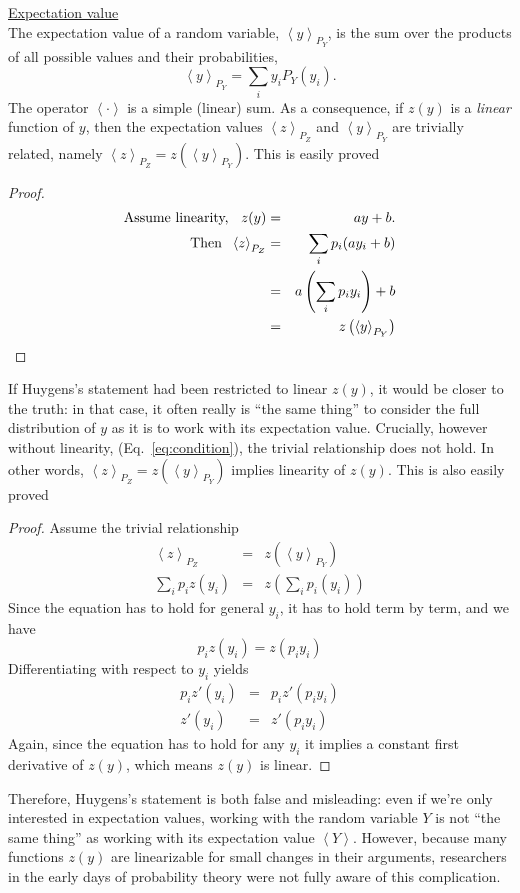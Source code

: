 \documentclass[pdftex]{article}
\newcommand{\ave}[1]{\left\langle#1 \right\rangle}
\newcommand{\elabel}[1]{\label{eq:#1}}
\newcommand{\eref}[1]{(Eq.~\ref{eq:#1})}
\newcommand{\be}{\begin{equation}}
\newcommand{\ee}{\end{equation}}
\newcommand{\bea}{\begin{eqnarray}}
\newcommand{\eea}{\end{eqnarray}}
\begin{document}
\underline{Expectation value}\\
The expectation value of a random variable, $\ave{y}_{P_Y}$, is the sum over the products of all possible values and their probabilities, 
\be
\ave{y}_{P_Y}=\sum_i y_i P_Y(y_i).
\ee
The operator $\ave{\cdot}$ is a simple (linear) sum. As a consequence, if $z(y)$ is a {\it linear} function of $y$, then the expectation values $\ave{z}_{P_Z}$ and
$\ave{y}_{P_Y}$ are trivially related, namely $\ave{z}_{P_Z}=z\left(\ave{y}_{P_Y}\right)$. 
This is easily proved
\begin{proof}
\bea
\text{Assume linearity, \hspace{.2cm}} z(y)&=&a y +b. \elabel{condition}\\
\text{Then \hspace{.1cm}}\ave{z}_{P_Z}&=& \sum_{i}p_i (a y_i + b)\\
&=&a \left(\sum_{i}p_i  y_i\right) + b\\
&=& z\left(\ave{y}_{P_Y}\right)
\eea
\end{proof}
If Huygens's statement had been restricted to linear $z(y)$, it would be closer to the truth: in that case, it often really is ``the same thing'' to consider the full distribution of $y$ as it is to work with its expectation value. 
Crucially, however without linearity, \eref{condition}, the trivial relationship does not hold. In other words, $\ave{z}_{P_Z}=z\left(\ave{y}_{P_Y}\right)$ implies linearity of $z(y)$. This is also easily proved
\begin{proof}
Assume the trivial relationship
\bea
\ave{z}_{P_Z}&=&z\left(\ave{y}_{P_Y}\right)\\
\sum_{i}p_i z(y_i) &=& z\left(\sum_{i}p_i(y_i) \right)
\eea
Since the equation has to hold for general $y_i$, it has to hold term by term, and we have
\be
p_i z(y_i) = z (p_i y_i)
\ee
Differentiating with respect to $y_i$ yields
\bea
p_i z'(y_i) &=& p_i z' (p_i y_i)\\
z'(y_i) &=& z' (p_i y_i)
\eea
Again, since the equation has to hold for any $y_i$ it implies a constant first derivative of $z(y)$, which means $z(y)$ is linear.
\end{proof}

Therefore, Huygens's statement is both false and misleading: even if we're only interested in expectation values, working with the random variable $Y$ is not ``the same thing'' as working with its expectation value $\ave{Y}$. However, because many functions $z(y)$ are linearizable for small changes in their arguments, researchers in the early days of probability theory were not fully aware of this complication.
\end{document}
